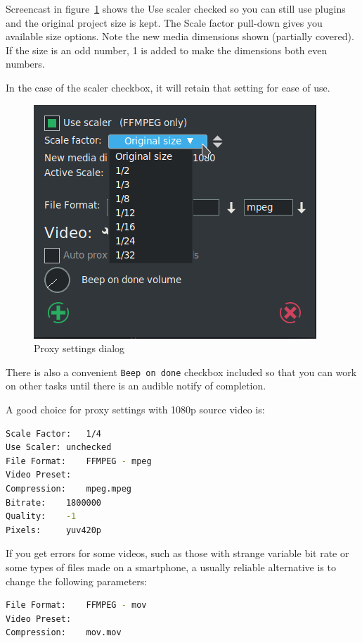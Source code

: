 Screencast in figure~\ref{fig:proxy-02} shows the Use scaler checked so you can still use plugins and the original project size is kept.  The Scale factor pull-down gives you available size options.  Note the new media dimensions shown (partially covered).  If the size is an odd number, 1 is added to make the dimensions both even numbers.

In the case of the scaler checkbox, it will retain that setting for ease of use.

\begin{figure}[htpb]
	\centering
	\includegraphics[width=0.8\linewidth]{images/proxy-02.png}
	\caption{Proxy settings dialog}
	\label{fig:proxy-02}
\end{figure}

There is also a convenient \texttt{Beep on done} checkbox included so that you can work on other tasks until there is an audible notify of completion.

A good choice for proxy settings with 1080p source video is:

\begin{lstlisting}[language=bash,numbers=none]
Scale Factor: 	1/4
Use Scaler:	unchecked
File Format:	FFMPEG - mpeg
Video Preset:
Compression:	mpeg.mpeg
Bitrate:	1800000
Quality:	-1
Pixels:		yuv420p
\end{lstlisting}

If you get errors for some videos, such as those with strange variable bit rate or some types of files made on a smartphone, a usually reliable alternative is to change the following parameters:

\begin{lstlisting}[language=bash,numbers=none]
File Format:	FFMPEG - mov
Video Preset:
Compression:	mov.mov
\end{lstlisting}

